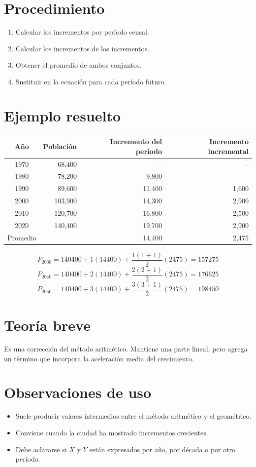 \documentclass[12pt]{article}
\begin{document}
\section{Procedimiento}
\begin{enumerate}
\item Calcular los incrementos por período censal.
\item Calcular los incrementos de los incrementos.
\item Obtener el promedio de ambos conjuntos.
\item Sustituir en la ecuación para cada período futuro.
\end{enumerate}

\section{Ejemplo resuelto}
\begin{center}
\begin{tabular}{crrr}
\toprule
Año & Población & Incremento del período & Incremento incremental \\
\midrule
1970 & 68,400 & -- & -- \\
1980 & 78,200 & 9,800 & -- \\
1990 & 89,600 & 11,400 & 1,600 \\
2000 & 103,900 & 14,300 & 2,900 \\
2010 & 120,700 & 16,800 & 2,500 \\
2020 & 140,400 & 19,700 & 2,900 \\
\midrule
Promedio & & 14,400 & 2,475 \\
\bottomrule
\end{tabular}
\end{center}

\[
P_{2030}=\num{140400}+1(\num{14400})+\frac{1(1+1)}{2}(\num{2475})=\num{157275}
\]
\[
P_{2040}=\num{140400}+2(\num{14400})+\frac{2(2+1)}{2}(\num{2475})=\num{176625}
\]
\[
P_{2050}=\num{140400}+3(\num{14400})+\frac{3(3+1)}{2}(\num{2475})=\num{198450}
\]


\section{Teoría breve}
Es una corrección del método aritmético. Mantiene una parte lineal, pero agrega un término que incorpora la aceleración media del crecimiento.

\section{Observaciones de uso}
\begin{itemize}
\item Suele producir valores intermedios entre el método aritmético y el geométrico.
\item Conviene cuando la ciudad ha mostrado incrementos crecientes.
\item Debe aclararse si $X$ y $Y$ están expresados por año, por década o por otro período.
\end{itemize}
\end{document}
